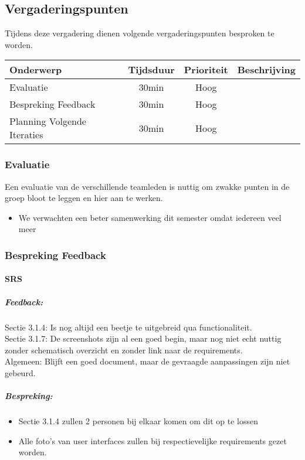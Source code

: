\subsection{Vergaderingspunten} 
Tijdens deze vergadering dienen volgende vergaderingspunten besproken te worden.
\begin{table} [H]
	\centering
	\begin{tabular} {l|c|c|c}
		Onderwerp & Tijdsduur & Prioriteit & Beschrijving \\ %
		\hline
		Evaluatie & 30min & Hoog & \\
		Bespreking Feedback & 30min & Hoog & \\
		Planning Volgende Iteraties & 30min & Hoog & \\
		
	\end{tabular}
\end{table}

\subsubsection{Evaluatie}

Een evaluatie van de verschillende teamleden is nuttig om zwakke punten in de groep bloot te leggen en hier aan te werken.

\begin{itemize}
	\item We verwachten een beter samenwerking dit semester omdat iedereen veel meer
\end{itemize}




\subsubsection{Bespreking Feedback}
\paragraph{SRS}
\subparagraph{Feedback:}
Sectie 3.1.4: Is nog altijd een beetje te uitgebreid qua functionaliteit.
\\
Sectie 3.1.7: De screenshots zijn al een goed begin, maar nog niet echt nuttig zonder schematisch overzicht en zonder link naar de requirements.
\\
Algemeen: Blijft een goed document, maar de gevraagde aanpassingen zijn niet gebeurd.
\subparagraph{Bespreking:}

\begin{itemize}
	\item Sectie 3.1.4 zullen 2 personen bij elkaar komen om dit op te lossen
	\item Alle foto's van user interfaces zullen bij respectievelijke requirements gezet worden. 
\end{itemize}


